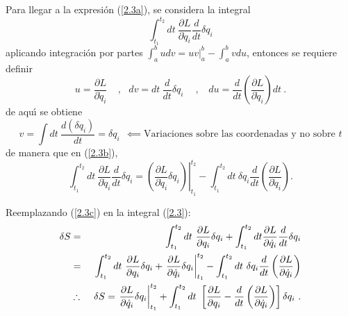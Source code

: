 \begin{solution}
Para llegar a la expresi\'{o}n (\ref{2.3a}), se considera la integral 
\begin{equation}
\int_{t_{1}}^{t_{2}}dt\ \frac{\partial L}{\partial \dot{q}_{i}} \frac{d}{dt} \delta q_{i}  \label{2.3b}
\end{equation}%
aplicando integraci\'{o}n por partes $\int_{a}^{b}udv=\left. uv\right\vert
_{a}^{b}-\int_{a}^{b}vdu$, entonces se requiere definir 
\begin{equation*}
u=\frac{\partial L}{\partial \dot{q}_{i}}~\ \ \ \ ,~~~dv=dt\ \frac{d}{dt} \delta q_{i} \quad \ ,~~\ \ du=\frac{d}{dt}\left( \frac{\partial L}{\partial 
\dot{q}_{i}}\right) dt~.
\end{equation*}%
de aqu\'{\i} se obtiene 
\begin{equation*}
v=\int dt\ \frac{d\left( \delta
q_{i}\right) }{dt}=\delta q_{i}~~\impliedby \text{Variaciones sobre las
coordenadas y no sobre $t$}
\end{equation*}%
de manera que en (\ref{2.3b}),
\begin{equation}
\int_{t_{1}}^{t_{2}}dt\ \frac{\partial L}{\partial \dot{q}_{i}} \frac{d}{dt}\delta q_{i}=\left. \left( \frac{\partial L}{\partial \dot{q}_{i}}\delta
q_{i}\right) \right\vert _{t_{1}}^{t_{2}}-\int_{t_{1}}^{t_{2}}dt\ \delta
q_{i}\frac{d}{dt}\left( \frac{\partial L}{\partial \dot{q}_{i}}\right).
\label{2.3c}
\end{equation}%

Reemplazando (\ref{2.3c}) en la integral (\ref{2.3}):%
\begin{eqnarray}
\delta S &=&\int_{t_{1}}^{t_{2}}dt\ \frac{\partial L}{\partial q_{i}}\delta
q_{i}+\int_{t_{1}}^{t_{2}}dt\frac{\partial L}{\partial \dot{q}_{i}}\frac{d}{dt}\delta q_{i} \notag\label{2.4a} \\
&=&\int_{t_{1}}^{t_{2}}dt\ \frac{\partial L}{\partial q_{i}}\delta
q_{i}+\left. \frac{\partial L}{\partial \dot{q}_{i}}\delta q_{i}\right\vert
_{t_{1}}^{t_{2}}-\int_{t_{1}}^{t_{2}}dt\ \delta q_{i}\frac{d}{dt}\left( 
\frac{\partial L}{\partial \dot{q}_{i}}\right)   \notag \\
&\therefore &~\delta S=\left. \frac{\partial L}{\partial \dot{q}_{i}}\delta
q_{i}\right\vert _{t_{1}}^{t_{2}}+\int_{t_{1}}^{t_{2}}dt\ \left[ \frac{%
\partial L}{\partial q_{i}}-\frac{d}{dt}\left( \frac{\partial L}{\partial 
\dot{q}_{i}}\right) \right] \delta q_{i}~.  \label{2.4}
\end{eqnarray}

\end{solution}

